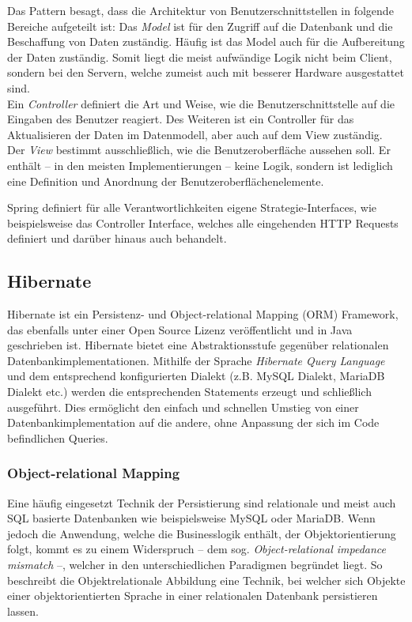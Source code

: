 				Das Pattern besagt, dass die Architektur von Benutzerschnittstellen in folgende Bereiche aufgeteilt ist: Das \textit{Model} ist für den Zugriff auf die Datenbank und die Beschaffung von Daten zuständig. Häufig ist das Model auch für die Aufbereitung der Daten zuständig. Somit liegt die meist aufwändige Logik nicht beim Client, sondern bei den Servern, welche zumeist auch mit besserer Hardware ausgestattet sind. \\
				Ein \textit{Controller} definiert die Art und Weise, wie die Benutzerschnittstelle auf die Eingaben des Benutzer reagiert. Des Weiteren ist ein Controller für das Aktualisieren der Daten im Datenmodell, aber auch auf dem View zuständig. \\
				Der \textit{View} bestimmt ausschließlich, wie die Benutzeroberfläche aussehen soll. Er enthält -- in den meisten Implementierungen -- keine Logik, sondern ist lediglich eine Definition und Anordnung der Benutzeroberflächenelemente.
				
				Spring definiert für alle Verantwortlichkeiten eigene Strategie-Interfaces, wie beispielsweise das Controller Interface, welches alle eingehenden \acs{HTTP} Requests definiert und darüber hinaus auch behandelt. 

		
		\subsection{Hibernate} %
		
			Hibernate ist ein Persistenz- und Object-relational Mapping (\acs{ORM}) Framework, das ebenfalls unter einer Open Source Lizenz veröffentlicht und in Java geschrieben ist. Hibernate bietet eine Abstraktionsstufe gegenüber relationalen Datenbankimplementationen. Mithilfe der Sprache \textit{Hibernate Query Language} und dem entsprechend konfigurierten Dialekt (z.B. MySQL Dialekt, MariaDB Dialekt etc.) werden die entsprechenden Statements erzeugt und schließlich ausgeführt. Dies ermöglicht den einfach und schnellen Umstieg von einer Datenbankimplementation auf die andere, ohne Anpassung der sich im Code befindlichen Queries. 
			
			\subsubsection{Object-relational Mapping} %
		
				Eine häufig eingesetzt Technik der Persistierung sind relationale und meist auch \acs{SQL} basierte Datenbanken wie beispielsweise MySQL oder MariaDB. Wenn jedoch die Anwendung, welche die Businesslogik enthält, der Objektorientierung folgt, kommt es zu einem Widerspruch -- dem sog. \textit{Object-relational impedance mismatch} --, welcher in den unterschiedlichen Paradigmen begründet liegt. So beschreibt die Objektrelationale Abbildung eine Technik, bei welcher sich Objekte einer objektorientierten Sprache in einer relationalen Datenbank persistieren lassen. \cite{Ireland.2009}
					
